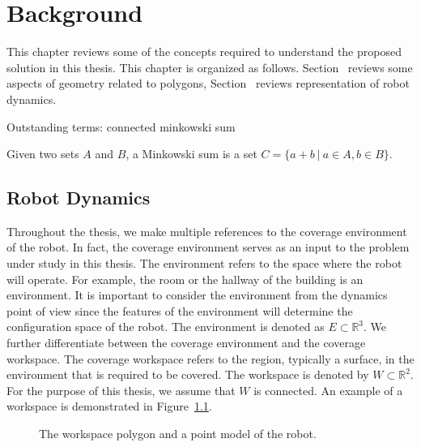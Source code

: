 \documentclass[../main.tex]{subfiles}
\begin{document}
\chapter{Background}
\label{chapter:background}

This chapter reviews some of the concepts required to understand the proposed solution in this thesis. This chapter is organized as follows. Section~ reviews some aspects of geometry related to polygons, Section~ reviews representation of robot dynamics. 

Outstanding terms:
connected
minkowski sum

\begin{definition}
Given two sets $A$ and $B$, a Minkowski sum is a set $C=\{a+b\ |\ a\in A, b\in B\}$.
\end{definition}


\section{Robot Dynamics}
\label{section:robot_dynamics}

Throughout the thesis, we make multiple references to the coverage environment of the robot. In fact, the coverage environment serves as an input to the problem under study in this thesis. The environment refers to the space where the robot will operate. For example, the room or the hallway of the building is an environment. It is important to consider the environment from the dynamics point of view since the features of the environment will determine the configuration space of the robot. The environment is denoted as $E\subset\mathbb{R}^3$. We further differentiate between the coverage environment and the coverage workspace. The coverage workspace refers to the region, typically a surface, in the environment that is required to be covered. The workspace is denoted by $W\subset\mathbb{R}^2$. For the purpose of this thesis, we assume that $W$ is connected. An example of a workspace is demonstrated in Figure~\ref{fig:workspace_and_system}.

\begin{figure}
	\centering
	
	\caption{The workspace polygon and a point model of the robot.}
	\label{fig:workspace_and_system}
\end{figure}

\end{document}
